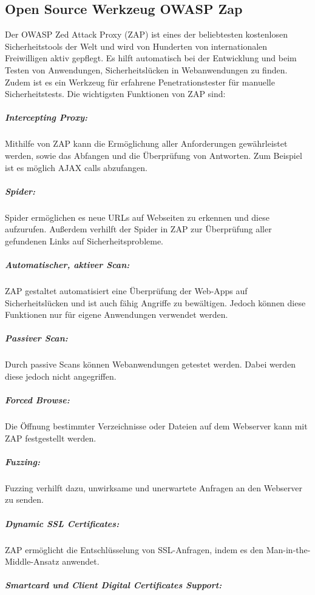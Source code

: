 \subsection{Open Source Werkzeug OWASP Zap}
\label{owaspzap-def}

Der OWASP Zed Attack Proxy (ZAP) ist eines der beliebtesten kostenlosen Sicherheitstools der Welt und wird von Hunderten von internationalen Freiwilligen aktiv gepflegt. Es hilft automatisch bei der Entwicklung und beim Testen von Anwendungen, Sicherheitslücken in Webanwendungen zu finden. Zudem ist es ein Werkzeug für erfahrene Penetrationstester für manuelle Sicherheitstests\cite{owasp18def}. Die wichtigsten Funktionen von ZAP sind\cite{owaspfunktionen18}:

\subparagraph{Intercepting Proxy:}

Mithilfe von ZAP kann die Ermöglichung aller Anforderungen gewährleistet werden, sowie das Abfangen und die Überprüfung von Antworten. Zum Beispiel ist es möglich AJAX calls abzufangen.

\subparagraph{Spider:}

Spider ermöglichen es neue URLs auf Webseiten zu erkennen und diese aufzurufen. Außerdem verhilft der Spider in ZAP zur Überprüfung aller gefundenen Links auf Sicherheitsprobleme. 

\subparagraph{Automatischer, aktiver Scan:}

ZAP gestaltet automatisiert eine Überprüfung der Web-Apps auf Sicherheitslücken und ist auch fähig Angriffe zu bewältigen. Jedoch können diese Funktionen nur für eigene Anwendungen verwendet werden. 

\subparagraph{Passiver Scan:}

Durch passive Scans können Webanwendungen getestet werden. Dabei werden diese jedoch nicht angegriffen. 

\subparagraph{Forced Browse:}

Die Öffnung bestimmter Verzeichnisse oder Dateien auf dem Webserver kann mit ZAP festgestellt werden. 

\subparagraph{Fuzzing:}

Fuzzing verhilft dazu, unwirksame und unerwartete Anfragen an den Webserver zu senden. 

\subparagraph{Dynamic SSL Certificates:}

ZAP ermöglicht die Entschlüsselung von SSL-Anfragen, indem es den Man-in-the-Middle-Ansatz anwendet.

\subparagraph{Smartcard und Client Digital Certificates Support:}

